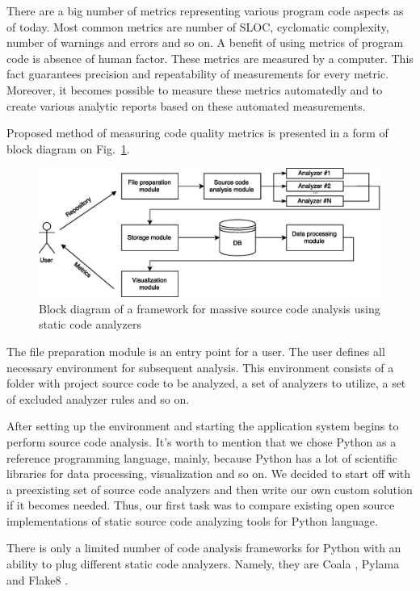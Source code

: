 \documentclass[runningheads,a4paper]{llncs}
\begin{document}
There are a big number of metrics representing various program code aspects
as of today. Most common metrics are number of SLOC, cyclomatic complexity,
number of warnings and errors and so on. A benefit of using metrics of program
code is absence of human factor. These metrics are measured by a computer.
This fact guarantees precision and repeatability of measurements for every
metric. Moreover, it becomes possible to measure these metrics automatedly
and to create various analytic reports based on these automated measurements.

Proposed method of measuring code quality metrics is presented in a form of
block diagram on Fig.~\ref{fig:structscheme}.

%
\begin{figure}
	\centering
	\includegraphics[width=\linewidth]{structscheme}
	\caption{Block diagram of a framework for massive source code analysis using static code analyzers}
	\label{fig:structscheme}
\end{figure}
%

The file preparation module is an entry point for a user. The user defines
all necessary environment for subsequent analysis. This environment consists
of a folder with project source code to be analyzed, a set of analyzers
to utilize, a set of excluded analyzer rules and so on.

After setting up the environment and starting the application system begins
to perform source code analysis. It’s worth to mention that we chose Python
as a reference programming language, mainly, because Python has a lot of
scientific libraries for data processing, visualization and so on. We decided
to start off with a preexisting set of source code analyzers and then write
our own custom solution if it becomes needed. Thus, our first task was to
compare existing open source implementations of static source code
analyzing tools for Python language.

There is only a limited number of code analysis frameworks for Python with an ability
to plug different static code analyzers. Namely, they are Coala \cite{item13},
Pylama \cite{item14} and Flake8 \cite{item15}.
\end{document}
